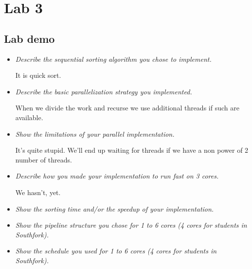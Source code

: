 \documentclass[a4paper,12pt]{article}
\begin{document}
\section{Lab 3}


\subsection{Lab demo}

\begin{itemize}

\item \textit{Describe the sequential sorting algorithm you chose to implement.}

  It is quick sort.

\item \textit{Describe the basic parallelization strategy you implemented.}

  When we divide the work and recurse we use additional threads if such are available.

\item \textit{Show the limitations of your parallel implementation.}

  It's quite stupid. We'll end up waiting for threads if we have a non power of 2 number of threads.

\item \textit{Describe how you made your implementation to run fast on 3 cores.}

  We hasn't, yet.

\item \textit{Show the sorting time and/or the speedup of your implementation.}


\item \textit{Show the pipeline structure you chose for 1 to 6 cores (4 cores for students in
Southfork).}

\item \textit{Show the schedule you used for 1 to 6 cores (4 cores for students in Southfork).}

\end{itemize}
\end{document}
